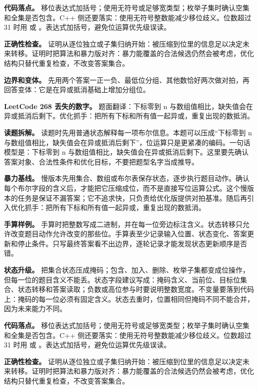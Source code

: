 \textbf{代码落点。} 移位表达式加括号；使用无符号或足够宽类型；枚举子集时确认空集和全集是否包含。C++ 侧还要落实：使用无符号整数能减少移位歧义。位数超过 31 时用  或 。表达式加括号，避免位运算优先级误读。

\textbf{正确性检查。} 证明从逐位独立或子集归纳开始：被压缩到位里的信息足以决定未来转移。证明时把算法和暴力版对齐：暴力能覆盖的合法候选仍然会被考虑，优化结构只替代重复检查，不改变答案集合。

\textbf{边界和变体。} 先用两个答案一正一负、最低位分组、其他数恰好两次做对拍，再回答变体：它是在异或抵消基础上增加分组位。

\noindent\textbf{LeetCode 268 丢失的数字。} 题面翻译：下标零到 n 与数组值相比，缺失值会在异或抵消后剩下。优化抓手：把所有下标和所有值一起异或，重复出现的数抵消。

\textbf{读题拆解。} 读题时先用普通状态解释每一项布尔信息。本题可以压成“下标零到 n 与数组值相比，缺失值会在异或抵消后剩下”，位运算只是更紧凑的编码。一句话模型是：下标零到 n 与数组值相比，缺失值会在异或抵消后剩下。这里要先确认答案对象、合法性条件和优化目标，不要把题型名字当成推导。

\textbf{暴力基线。} 慢版本先用集合、数组或布尔表保存状态，逐步执行题目动作。确认每个布尔字段的含义后，才能把它压缩成位，而不是直接写位运算公式。这个慢版本的任务是保证不漏答案；它不追求快，只负责给优化版提供对拍基准。随后再引入优化抓手：把所有下标和所有值一起异或，重复出现的数抵消。

\textbf{手算样例。} 手算时把整数写成二进制，并在每一位旁边标注含义。状态转移只允许改变题目动作允许改变的那些位。手算表至少记录输入位置、状态变化、答案更新和停止条件。只写最终答案看不出边界，逐轮记录才能发现状态更新顺序是否错。

\textbf{状态升级。} 把集合状态压成掩码；包含、加入、删除、枚举子集都变成位操作，但每一位的题目含义不能丢。状态字段建议写成：掩码含义、当前位、目标位集合、状态转移和答案读取；负数或高位参与时要说明整数宽度。不变量要落到代码上：掩码的每一位必须有固定含义。状态去重时，位置相同但掩码不同不能合并，因为未来能力不同。

\textbf{代码落点。} 移位表达式加括号；使用无符号或足够宽类型；枚举子集时确认空集和全集是否包含。C++ 侧还要落实：使用无符号整数能减少移位歧义。位数超过 31 时用  或 。表达式加括号，避免位运算优先级误读。

\textbf{正确性检查。} 证明从逐位独立或子集归纳开始：被压缩到位里的信息足以决定未来转移。证明时把算法和暴力版对齐：暴力能覆盖的合法候选仍然会被考虑，优化结构只替代重复检查，不改变答案集合。

